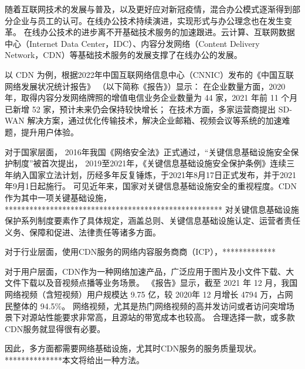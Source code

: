 
随着互联网技术的发展与普及，以及更好应对新冠疫情，混合办公模式逐渐得到部分企业与员工的认可。在线办公技术持续演进，实现形式与办公理念也在发生变革。
在线办公技术的进步离不开基础技术服务的加速跟进。云计算、互联网数据中心（Internet Data Center，IDC）、内容分发网络（Content Delivery Network，CDN）等基础技术服务的发展支撑了在线办公的发展。

以 CDN 为例，根据2022年中国互联网络信息中心（CNNIC）发布的《中国互联网络发展状况统计报告》\cite{cnnic2022} （以下简称《报告》）显示：
在企业数量方面，2020 年，取得内容分发网络牌照的增值电信业务企业数量为 44 家，2021 年前 11 个月已新增 52 家，预计未来仍会保持较快增长；
在技术方面，多家运营商提出 SD-WAN 解决方案，通过优化传输技术，解决企业邮箱、视频会议等系统的加速难题，提升用户体验。


对于国家层面，
2016年我国《网络安全法》正式通过，“关键信息基础设施安全保护制度”被首次提出，
2019至2021年，《关键信息基础设施安全保护条例》连续三年纳入国家立法计划，历经多年反复锤炼，于2021年8月17日正式发布，并于2021年9月1日起施行。
可见近年来，国家对关键信息基础设施安全的重视程度。CDN作为其中一项关键基础设施，*****************************************************
对关键信息基础设施保护系列制度要素作了具体规定，涵盖总则、关键信息基础设施认定、运营者责任义务、保障和促进、法律责任等诸多方面。



对于行业层面，使用CDN服务的网络内容服务商商（ICP），*************


对于用户层面，CDN作为一种网络加速产品，广泛应用于图片及小文件下载、大文件下载以及音视频点播等业务场景。
《报告》显示，截至 2021 年 12 月，我国网络视频（含短视频）用户规模达 9.75 亿，较 2020年 12 月增长 4794 万，占网民整体的 94.5\%。
网络视频，尤其是热门网络视频的高并发访问或者访问突增场景下对源站性能要求非常高，且源站的带宽成本也较高。
合理选择一款，或多款CDN服务就显得很有必要。

因此，多方面都需要网络基础设施，尤其时CDN服务的服务质量现状。**************本文将给出一种方法。



